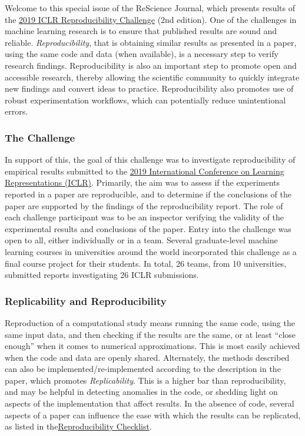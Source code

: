 Welcome to this special issue of the ReScience Journal, which presents results of the \href{https://reproducibility-challenge.github.io/iclr_2019/}{2019 ICLR Reproducibility Challenge} (2nd edition). One of the challenges in machine learning research is to ensure that published results are sound and reliable. \textit{Reproducibility}, that is obtaining similar results as presented in a paper, using the same code and data (when available), is a necessary step to verify research findings. Reproducibility is also an important step to promote open and accessible research, thereby allowing the scientific community to quickly integrate new findings and convert ideas to practice.  Reproducibility also promotes use of robust experimentation workflows, which can potentially reduce unintentional errors.

\subsubsection{The Challenge} 

In support of this, the goal of this challenge was to investigate reproducibility of empirical results submitted to the \href{https://iclr.cc/}{2019 International Conference on Learning Representations (ICLR)}. Primarily, the aim was to assess if the experiments reported in a paper are reproducible, and to determine if the conclusions of the paper are supported by the findings of the reproducibility report. The role of each challenge participant was to be an inspector verifying the validity of the experimental results and conclusions of the paper.  Entry into the challenge was open to all, either individually or in a team.  Several graduate-level machine learning courses in universities around the world incorporated this challenge as a final course project for their students.   In total, 26 teams, from 10 universities, submitted reports investigating 26 ICLR submissions.

\subsubsection{Replicability and Reproducibility} 

Reproduction of a computational study means running the same code, using the same input data, and then checking if the results are the same, or at least “close enough” when it comes to numerical approximations. This is most easily achieved when the code and data are openly shared.  Alternately, the methods described can also be implemented/re-implemented according to the description in the paper, which promotes \textit{Replicability}. This is a higher bar than reproducibility, and may be helpful in detecting anomalies in the code, or shedding light on aspects of the implementation that affect results.  In the absence of code, several aspects of a paper can influence the ease with which the results can be replicated, as listed in the\href{https://www.cs.mcgill.ca/~jpineau/ReproducibilityChecklist.pdf}{Reproducibility Checklist}. 


